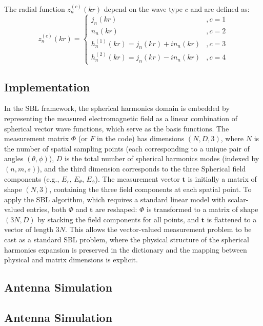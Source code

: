 \documentclass{article}
\begin{document}
The radial function \(z_n^{(c)}(kr)\) depend on the wave type \(c\) and are defined as:
\begin{equation}
    z_n^{(c)}(kr) = \begin{cases}
        j_n(kr) & , c = 1 \\
        n_n(kr) & , c = 2 \\
        h_n^{(1)}(kr) = j_n(kr) + i n_n(kr) & , c = 3 \\
        h_n^{(2)}(kr) = j_n(kr) - i n_n(kr) & , c = 4
    \end{cases}
\end{equation}

\subsection{Implementation}
In the SBL framework, the spherical harmonics domain is embedded by representing the measured electromagnetic field as a linear combination of spherical vector wave functions, which serve as the basis functions. The measurement matrix $\Phi$ (or $F$ in the code) has dimensions $(N, D, 3)$, where $N$ is the number of spatial sampling points (each corresponding to a unique pair of angles $(\theta, \phi)$), $D$ is the total number of spherical harmonics modes (indexed by $(n, m, s)$), and the third dimension corresponds to the three Spherical field components (e.g., $E_r$, $E_\theta$, $E_\phi$). The measurement vector $\mathbf{t}$ is initially a matrix of shape $(N, 3)$, containing the three field components at each spatial point. To apply the SBL algorithm, which requires a standard linear model with scalar-valued entries, both $\Phi$ and $\mathbf{t}$ are reshaped: $\Phi$ is transformed to a matrix of shape $(3N, D)$ by stacking the field components for all points, and $\mathbf{t}$ is flattened to a vector of length $3N$. This allows the vector-valued measurement problem to be cast as a standard SBL problem, where the physical structure of the spherical harmonics expansion is preserved in the dictionary and the mapping between physical and matrix dimensions is explicit.

\subsection{Antenna Simulation}

\subsection{Antenna Simulation}
\end{document}
